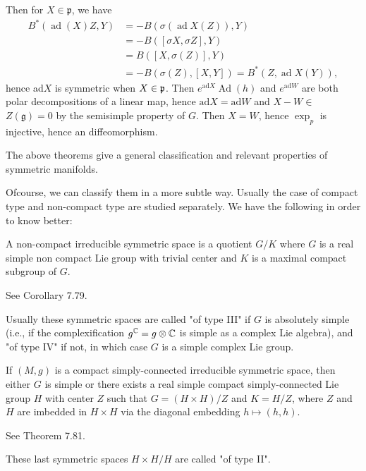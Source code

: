 Then for $X \in \mathfrak{p}$, we have
\[
\begin{aligned}
	B^{*}(\operatorname{ad}(X) Z, Y)
	&=-B(\sigma(\operatorname{ad} X(Z)), Y) \\
	&=-B([\sigma X, \sigma Z], Y) \\
	&=B([X, \sigma(Z)], Y) \\
	&=-B(\sigma(Z),[X, Y])=B^{*}(Z, \operatorname{ad} X(Y)),
\end{aligned}
\]
hence ad$X$ is symmetric when $X \in \mathfrak{{\mathfrak p}}$. Then
$e^{\mathrm{ad} X} \operatorname{Ad}(h)$ and $e^{\mathrm{ad} W}$
are both polar decompositions of a linear map, hence
$\mathrm{ad} X = \mathrm{ad}W$ and $X-W \in$ $Z(\mathfrak{g})=0$
by the semisimple property of $G$. Then $X=W$, hence $\exp _{p}$
is injective, hence an diffeomorphism.
\eproof

The above theorems give  a general classification and relevant
properties of symmetric manifolds.

Ofcourse, we can classify them in a more subtle way. Usually the
case of compact type and non-compact type are studied
separately. We have the following  in order to know better:

\begin{proposition}
	A non-compact irreducible symmetric space is a quotient ${G}
	/ {K}$ where $G$ is a real simple non compact Lie group with
	trivial center and $K$ is a maximal compact subgroup of $G$.
\end{proposition}
\bproof
See \cite{Besse} Corollary 7.79.
\eproof
\begin{remark}
	 Usually these symmetric spaces are called "of type III" if
	 $G$ is absolutely simple (i.e., if the complexification
	 $g^{{\mathbb C}} = g \otimes \mathbb{C}$ is simple as a complex Lie
	 algebra), and "of type IV" if not, in which case $G$ is a
	 simple complex Lie group. 
\end{remark}
\begin{theorem}\label{3}
	If $(M, g)$ is a compact simply-connected irreducible
	symmetric space, then either $G$ is simple or there exists a
	real simple compact simply-connected Lie group $H$ with
	center $Z$ such that $G=(H \times H) / Z$ and $K=H / Z$,
	where $Z$ and $H$ are imbedded in $H \times H$ via the
	diagonal embedding $h \mapsto(h, h)$.
\end{theorem}
\bproof
See \cite{Besse} Theorem 7.81.
\eproof
\begin{remark}
	These last symmetric spaces $H \times H / H$ are called "of
	type II". 	
\end{remark}

